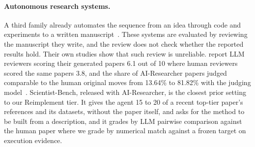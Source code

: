 \documentclass{article} %
\begin{document}
\paragraph{Autonomous research systems.}
A third family already automates the sequence from an idea through code and experiments to a
written manuscript~\citep{lu2024aiscientist,lu2026automation}. These systems are evaluated by
reviewing the manuscript they write, and the review does not check whether the reported
results hold. Their own studies show that such review is unreliable.
\citet{schmidgall2025agentlab} report LLM reviewers scoring their generated papers 6.1 out of
10 where human reviewers scored the same papers 3.8, and the share of AI-Researcher papers
judged comparable to the human original moves from 13.64\% to 81.82\% with the judging
model~\citep{tang2025airesearcher}. Scientist-Bench, released with AI-Researcher, is the
closest prior setting to our Reimplement tier. It gives the agent 15 to 20 of a recent top-tier paper's references and its
datasets, without the paper itself, and asks for the method to be built from
a description, and it grades by LLM pairwise comparison against the human paper where we grade
by numerical match against a frozen target on execution evidence.
\end{document}
